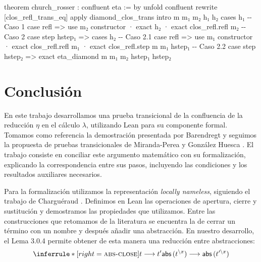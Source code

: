 \documentclass[
  spanish,
  letterpaper,
  DIV=11,
  numbers=noendperiod]{scrreprt}
\newenvironment{Shaded}{\begin{snugshade}}{\end{snugshade}}
\newcommand{\CommentTok}[1]{\textcolor[rgb]{0.37,0.37,0.37}{#1}}
\newcommand{\KeywordTok}[1]{\textcolor[rgb]{0.00,0.23,0.31}{\textbf{#1}}}
\newcommand{\NormalTok}[1]{\textcolor[rgb]{0.00,0.23,0.31}{#1}}
\renewcommand{\NormalTok}[1]{\textcolor[HTML]{000000}{#1}}
\renewcommand{\KeywordTok}[1]{\textcolor[HTML]{0000FF}{#1}}
\renewcommand{\CommentTok}[1]{\textcolor[HTML]{008000}{#1}}
\let\oldgreater\textgreater
\renewcommand{\textgreater}{\null\oldgreater}%
\theoremstyle{remark}
\begin{document}
\begin{Shaded}
\begin{Highlighting}[]
\KeywordTok{theorem}\NormalTok{ church\_rosser : confluent eta := }\KeywordTok{by}
\NormalTok{  unfold confluent}
  \KeywordTok{rewrite}\NormalTok{ [clos\_refl\_trans\_eq]}
  \KeywordTok{apply}\NormalTok{ diamond\_clos\_trans}
\NormalTok{  intro m m₁ m₂ h₁ h₂}
\NormalTok{  cases h₁}
  \CommentTok{{-}{-} Caso 1}
\NormalTok{  case refl =\textgreater{}}
\NormalTok{    use m₂}
\NormalTok{    constructor}
\NormalTok{    · }\KeywordTok{exact}\NormalTok{ h₂}
\NormalTok{    · }\KeywordTok{exact}\NormalTok{ clos\_refl.refl m₂}
  \CommentTok{{-}{-} Caso 2}
\NormalTok{  case step hstep₁ =\textgreater{}}
\NormalTok{    cases h₂}
    \CommentTok{{-}{-} Caso 2.1}
\NormalTok{    case refl =\textgreater{}}
\NormalTok{      use m₁}
\NormalTok{      constructor}
\NormalTok{      · }\KeywordTok{exact}\NormalTok{ clos\_refl.refl m₁}
\NormalTok{      · }\KeywordTok{exact}\NormalTok{ clos\_refl.step m m₁ hstep₁}
    \CommentTok{{-}{-} Caso 2.2}
\NormalTok{    case step hstep₂ =\textgreater{}}
      \KeywordTok{exact}\NormalTok{ eta\_diamond m m₁ m₂ hstep₁ hstep₂}
\end{Highlighting}
\end{Shaded}


\chapter*{Conclusión}\label{conclusiuxf3n}


En este trabajo desarrollamos una prueba transicional de la confluencia
de la reducción \(\eta\) en el cálculo \(\lambda\), utilizando Lean para
su componente formal. Tomamos como referencia la demostración presentada
por Barendregt \autocite{barendregt1984} y seguimos la propuesta de
pruebas transicionales de Miranda-Perea y González Huesca
\autocite{miranda2022}. El trabajo consiste en conciliar este argumento
matemático con su formalización, explicando la correspondencia entre sus
pasos, incluyendo las condiciones y los resultados auxiliares
necesarios.

Para la formalización utilizamos la representación \emph{locally
nameless}, siguiendo el trabajo de Charguéraud
\autocite{chargueraud2012}. Definimos en Lean las operaciones de
apertura, cierre y sustitución y demostramos las propiedades que
utilizamos. Entre las construcciones que retomamos de la literatura se
encuentra la de cerrar un término con un nombre y después añadir una
abstracción. En nuestro desarrollo, el Lema 3.0.4 permite obtener de
esta manera una reducción entre abstracciones: \[
\inferrule*[right=\textsc{abs-close}]
  {t \longrightarrow t'}
  {\mathsf{abs}\,(t^{\backslash x})
    \longrightarrow
    \mathsf{abs}\,(t'^{\backslash x})}
\]
\end{document}
